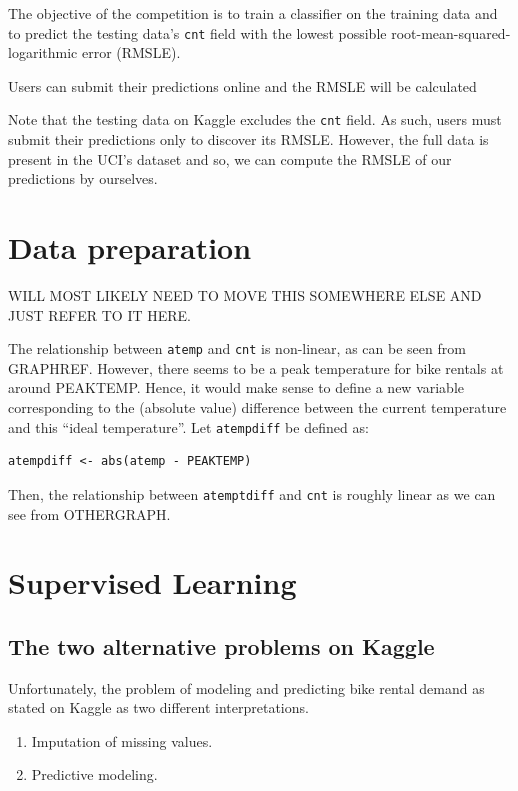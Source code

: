 \documentclass[12pt]{article}
\begin{document}
The objective of the competition is to train a classifier on the training data and to predict the testing data's \texttt{cnt} field with the lowest possible root-mean-squared-logarithmic error (RMSLE).

Users can submit their predictions online and the RMSLE will be calculated

Note that the testing data on Kaggle excludes the \texttt{cnt} field. As such, users must submit their predictions only to discover its RMSLE. However, the full data is present in the UCI's dataset and so, we can compute the RMSLE of our predictions by ourselves.

\section{Data preparation}
WILL MOST LIKELY NEED TO MOVE THIS SOMEWHERE ELSE AND JUST REFER TO IT HERE.

The relationship between \texttt{atemp} and \texttt{cnt} is non-linear, as can be seen from GRAPHREF. However, there seems to be a peak temperature for bike rentals at around PEAKTEMP. Hence, it would make sense to define a new variable corresponding to the (absolute value) difference between the current temperature and this ``ideal temperature''. Let \texttt{atempdiff} be defined as:
\begin{verbatim}
atempdiff <- abs(atemp - PEAKTEMP)
\end{verbatim}
Then, the relationship between \texttt{atemptdiff} and \texttt{cnt} is roughly linear as we can see from OTHERGRAPH.

\section{Supervised Learning}
\label{supervised learning}

\subsection{The two alternative problems on Kaggle}

Unfortunately, the problem of modeling and predicting bike rental demand as stated on Kaggle as two different interpretations.

\begin{enumerate}
	\item Imputation of missing values.
	\item Predictive modeling.
\end{enumerate}
\end{document}
